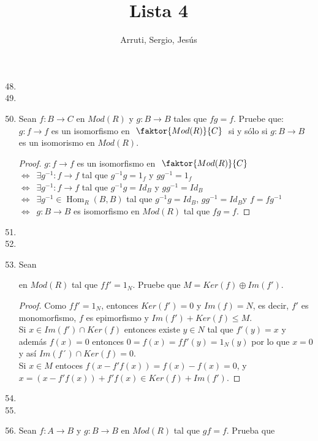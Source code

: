 \documentclass{article}
\title{Lista 4}
\author{Arruti, Sergio, Jesús}
\date{}
\begin{document}
	\maketitle
	\begin{enumerate}[label=\textbf{Ej \arabic*.}]
		\setcounter{enumi}{47}
\item 
\item
\item Sean $f\colon B\rightarrow C$ en $Mod(R)$ y $g\colon B\longrightarrow B$ tales que $fg=f$. Pruebe que:\\
$g\colon f\longrightarrow f$ es un isomorfismo en \,\,$\faktor{Mod(R)}{C}$ \,\,si y sólo si $g\colon B\longrightarrow B$ es un isomorismo en $Mod(R)$.
\begin{proof}

$g\colon f\longrightarrow f$ es un isomorfismo en \,\,$\faktor{Mod(R)}{C}$\,\,\\
$\iff \,\,\,\exists g^{-1}\colon f\longrightarrow f$  tal que $g^{-1}g=1_f$ y $gg^{-1}=1_f$\\
$\iff \,\,\,\exists g^{-1}\colon f\longrightarrow f$  tal que $g^{-1}g=Id_B$ y $gg^{-1}=Id_B$\\
$\iff \,\,\,\exists g^{-1}\in \operatorname{Hom}_R(B,B)$ tal que $g^{-1}g=Id_B$, $gg^{-1}=Id_B$y  $f=fg^{-1}$\\
$\iff \,\,\,g\colon B\longrightarrow B$ es isomorfismo en $Mod(R)$ tal que $fg=f$.
\end{proof}

\item
\item
\item Sean 
en $Mod(R)$ tal que $ff'=1_N.$ Pruebe que $M=Ker(f)\oplus Im(f')$.
\begin{proof}
Como $ff'=1_N$, entonces $Ker(f')=0$ y $Im(f)=N$, es decir, $f'$ es monomorfismo, $f$ es epimorfismo y  $Im(f')+Ker(f)\leq M$.\\
Si $x\in Im(f')\cap Ker(f)$ entonces existe $y\in N$ tal que $f'(y)=x$ y además $f(x)=0$ entonces $0=f(x)=ff'(y)=1_N(y)$
por lo que $x=0$ y así $Im(f´)\cap Ker(f)=0$.\\

Si $x\in M$ entoces $f(x-f'f(x))=f(x)-f(x)=0$, \quad y \\
$x=(x-f'f(x))+f'f(x)\in Ker (f)+Im(f').$
\end{proof}

\item
\item
\item Sean $f\colon A\longrightarrow B$ y $g\colon B\longrightarrow B$ en $Mod(R)$ tal que $gf=f$. Prueba que\\


\end{enumerate}
\end{document}
